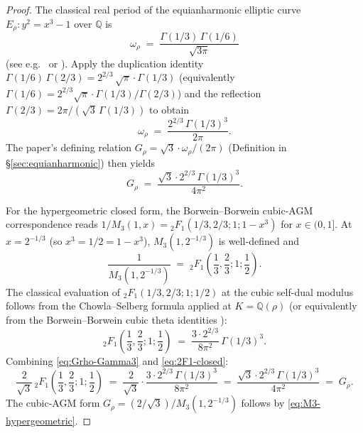 \documentclass[11pt]{article}
\theoremstyle{definition}
\theoremstyle{remark}
\newcommand{\Q}{\mathbb{Q}}
\begin{document}
\begin{proof}
The classical real period of the equianharmonic elliptic curve
$E_\rho: y^2 = x^3 - 1$ over $\Q$ is
\[
\omega_\rho \;=\; \frac{\Gamma(1/3)\,\Gamma(1/6)}{\sqrt{3\pi}}
\]
(see e.g.\ \cite[\S{}22.31]{whittaker-watson} or \cite[\S{}3.4]{borweinAGM}).
Apply the duplication identity
$\Gamma(1/6)\,\Gamma(2/3) = 2^{2/3}\,\sqrt\pi \cdot \Gamma(1/3)$
(equivalently $\Gamma(1/6) = 2^{2/3}\sqrt\pi \cdot \Gamma(1/3)/\Gamma(2/3)$)
and the reflection $\Gamma(2/3) = 2\pi/(\sqrt 3\,\Gamma(1/3))$ to obtain
\begin{equation}
\omega_\rho \;=\; \frac{2^{2/3}\,\Gamma(1/3)^{3}}{2\pi}.
\label{eq:omega-rho-Gamma3}
\end{equation}
The paper's defining relation $G_\rho = \sqrt 3 \cdot \omega_\rho/(2\pi)$
(Definition in \S\ref{sec:equianharmonic}) then yields
\begin{equation}
G_\rho \;=\; \frac{\sqrt 3 \cdot 2^{2/3}\,\Gamma(1/3)^{3}}{4\pi^{2}}.
\label{eq:Grho-Gamma3}
\end{equation}

For the hypergeometric closed form, the Borwein--Borwein cubic-AGM
correspondence \cite{borwein-cubic-agm} reads
$1/M_3(1, x) = {}_2F_1(1/3, 2/3; 1; 1 - x^{3})$ for $x \in (0, 1]$.
At $x = 2^{-1/3}$ (so $x^3 = 1/2 = 1 - x^3$),
$M_3(1, 2^{-1/3})$ is well-defined and
\begin{equation}
\frac{1}{M_3(1, 2^{-1/3})} \;=\; {}_2F_1\!\left(\frac{1}{3}, \frac{2}{3}; 1; \frac{1}{2}\right).
\label{eq:M3-hypergeometric}
\end{equation}
The classical evaluation of ${}_2F_1(1/3, 2/3; 1; 1/2)$ at the cubic
self-dual modulus follows from the Chowla--Selberg formula applied at
$K = \Q(\rho)$ (or equivalently from the Borwein--Borwein cubic theta
identities \cite[\S{}3.4]{borweinAGM}):
\begin{equation}
{}_2F_1\!\left(\frac{1}{3}, \frac{2}{3}; 1; \frac{1}{2}\right)
\;=\; \frac{3 \cdot 2^{2/3}}{8\pi^{2}}\,\Gamma(1/3)^{3}.
\label{eq:2F1-closed}
\end{equation}
Combining \eqref{eq:Grho-Gamma3} and \eqref{eq:2F1-closed}:
\[
\frac{2}{\sqrt 3}\,{}_2F_1\!\left(\frac{1}{3}, \frac{2}{3}; 1; \frac{1}{2}\right)
  \;=\; \frac{2}{\sqrt 3} \cdot \frac{3 \cdot 2^{2/3}\,\Gamma(1/3)^{3}}{8\pi^{2}}
  \;=\; \frac{\sqrt 3 \cdot 2^{2/3}\,\Gamma(1/3)^{3}}{4\pi^{2}}
  \;=\; G_\rho.
\]
The cubic-AGM form $G_\rho = (2/\sqrt 3)/M_3(1, 2^{-1/3})$ follows by
\eqref{eq:M3-hypergeometric}. \qedhere
\end{proof}
\end{document}
